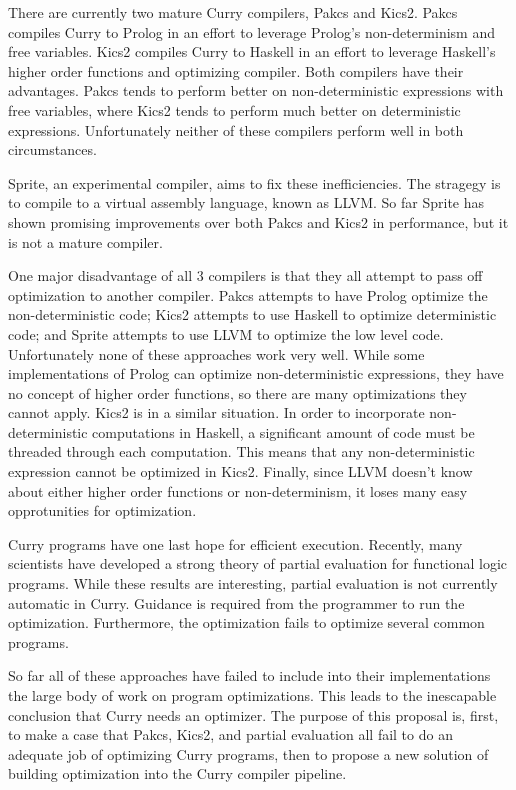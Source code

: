 There are currently two mature Curry compilers, Pakcs and Kics2.
Pakcs compiles Curry to Prolog in an effort to leverage Prolog's non-determinism and free variables.
Kics2 compiles Curry to Haskell in an effort to leverage Haskell's higher order functions and optimizing compiler.
Both compilers have their advantages.  Pakcs tends to perform better on non-deterministic expressions with free variables,
where Kics2 tends to perform much better on deterministic expressions.
Unfortunately neither of these compilers perform well in both circumstances.

Sprite, an experimental compiler, aims to fix these inefficiencies.
The stragegy is to compile to a virtual assembly language, known as LLVM.
So far Sprite has shown promising improvements over both Pakcs and Kics2 in performance,
but it is not a mature compiler.

One major disadvantage of all 3 compilers is that they all attempt to pass off optimization to another compiler.
Pakcs attempts to have Prolog optimize the non-deterministic code; Kics2 attempts to use Haskell to optimize
deterministic code; and Sprite attempts to use LLVM to optimize the low level code.
Unfortunately none of these approaches work very well.
While some implementations of Prolog can optimize non-deterministic expressions, they have no concept of higher order functions,
so there are many optimizations they cannot apply.
Kics2 is in a similar situation.  
In order to incorporate non-deterministic computations in Haskell, 
a significant amount of code must be threaded through each computation.
This means that any non-deterministic expression cannot be optimized in Kics2.
Finally, since LLVM doesn't know about either higher order functions or non-determinism, it loses many easy opprotunities for optimization.

Curry programs have one last hope for efficient execution.
Recently, many scientists \cite{peval_bjorn, offline_peval_Ramos} 
have developed a strong theory of partial evaluation for functional logic programs.
While these results are interesting, partial evaluation is not currently automatic in Curry.
Guidance is required from the programmer to run the optimization.
Furthermore, the optimization fails to optimize several common programs.

So far all of these approaches have failed to include into their implementations the large body of work on program optimizations.
This leads to the inescapable conclusion that Curry needs an optimizer.
The purpose of this proposal is, first, to make a case that Pakcs, Kics2, and partial evaluation all fail to do an adequate job
of optimizing Curry programs, then to propose a new solution of building optimization into the Curry compiler pipeline.

